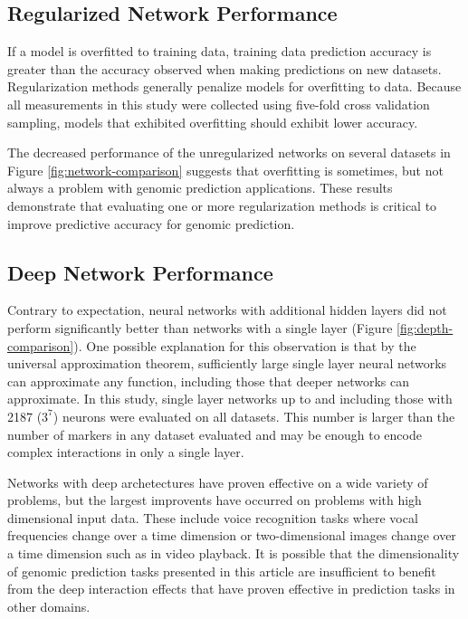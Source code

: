\ifdefined\showtablesandfigures
\fi

\subsection*{Regularized Network Performance}

If a model is overfitted to training data, training data prediction accuracy is greater than 
the accuracy observed when making predictions on new datasets. Regularization methods
generally penalize models for overfitting to data. Because all measurements in this study 
were collected using five-fold cross validation sampling, models that exhibited overfitting 
should exhibit lower accuracy. 

The decreased performance of the unregularized networks on several datasets in Figure 
\ref{fig:network-comparison} suggests that overfitting is sometimes, but not always
a problem with genomic prediction applications. These results demonstrate that 
evaluating one or more regularization methods is critical to improve predictive accuracy for 
genomic prediction.

\ifdefined\showtablesandfigures
\fi

\subsection*{Deep Network Performance}

Contrary to expectation, neural networks with additional hidden layers did not perform
significantly better than networks with a single layer (Figure \ref{fig:depth-comparison}). 
One possible explanation for this observation is that by the universal approximation theorem,
sufficiently large single layer neural networks can approximate any function, including those
that deeper networks can approximate. In this study, single layer networks up to and including
those with 2187 ($3^7$) neurons were evaluated on all datasets. This number is larger than the number
of markers in any dataset evaluated and may be enough to encode complex interactions in only a single
layer.

Networks with deep archetectures have proven effective on a wide variety of problems, but the largest
improvents have occurred on problems with high dimensional input data. These include voice recognition 
tasks where vocal frequencies change over a time dimension or two-dimensional images change over 
a time dimension such as in video playback. It is possible that the dimensionality of genomic 
prediction tasks presented in this article are insufficient to benefit from the deep interaction 
effects that have proven effective in prediction tasks in other domains. 

